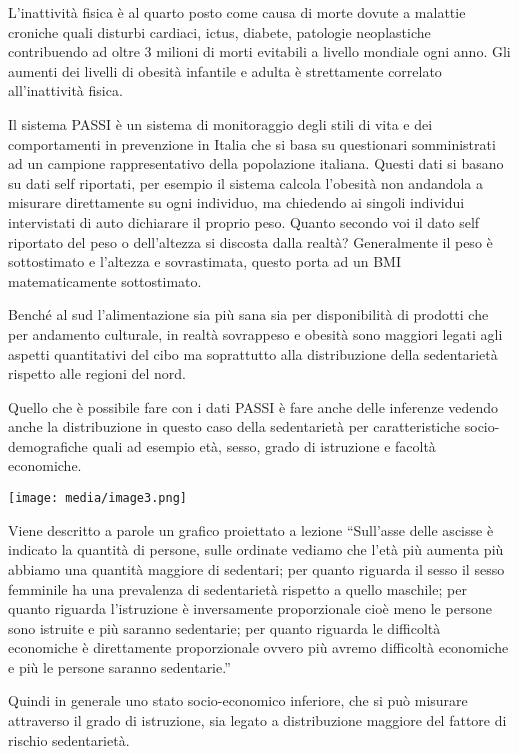 \documentclass[]{article}
\begin{document}
L'inattività fisica è al quarto posto come causa di morte dovute a
malattie croniche quali disturbi cardiaci, ictus, diabete, patologie
neoplastiche contribuendo ad oltre 3 milioni di morti evitabili a
livello mondiale ogni anno. Gli aumenti dei livelli di obesità infantile
e adulta è strettamente correlato all'inattività fisica.

Il sistema PASSI è un sistema di monitoraggio degli stili di vita e dei
comportamenti in prevenzione in Italia che si basa su questionari
somministrati ad un campione rappresentativo della popolazione italiana.
Questi dati si basano su dati self riportati, per esempio il sistema
calcola l'obesità non andandola a misurare direttamente su ogni
individuo, ma chiedendo ai singoli individui intervistati di auto
dichiarare il proprio peso. Quanto secondo voi il dato self riportato
del peso o dell'altezza si discosta dalla realtà? Generalmente il peso è
sottostimato e l'altezza e sovrastimata, questo porta ad un BMI
matematicamente sottostimato.

Benché al sud l'alimentazione sia più sana sia per disponibilità di
prodotti che per andamento culturale, in realtà sovrappeso e obesità
sono maggiori legati agli aspetti quantitativi del cibo ma soprattutto
alla distribuzione della sedentarietà rispetto alle regioni del nord.

Quello che è possibile fare con i dati PASSI è fare anche delle
inferenze vedendo anche la distribuzione in questo caso della
sedentarietà per caratteristiche socio-demografiche quali ad esempio
età, sesso, grado di istruzione e facoltà economiche.

\texttt{[image: media/image3.png]}

Viene descritto a parole un grafico proiettato a lezione ``Sull'asse
delle ascisse è indicato la quantità di persone, sulle ordinate vediamo
che l'età più aumenta più abbiamo una quantità maggiore di sedentari;
per quanto riguarda il sesso il sesso femminile ha una prevalenza di
sedentarietà rispetto a quello maschile; per quanto riguarda
l'istruzione è inversamente proporzionale cioè meno le persone sono
istruite e più saranno sedentarie; per quanto riguarda le difficoltà
economiche è direttamente proporzionale ovvero più avremo difficoltà
economiche e più le persone saranno sedentarie.''

Quindi in generale uno stato socio-economico inferiore, che si può
misurare attraverso il grado di istruzione, sia legato a distribuzione
maggiore del fattore di rischio sedentarietà.
\end{document}
